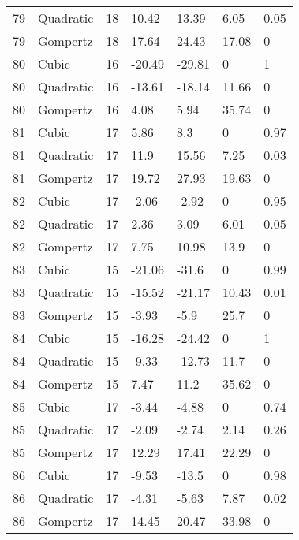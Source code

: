 \documentclass[11pt]{article}
\begin{document}
\begin{center}
\begin{longtable}{lllllll}
    79  & Quadratic & 18              & 10.42   & 13.39   & 6.05    & 0.05 \\
    79  & Gompertz  & 18              & 17.64   & 24.43   & 17.08   & 0    \\
    80  & Cubic     & 16              & -20.49  & -29.81  & 0       & 1    \\
    80  & Quadratic & 16              & -13.61  & -18.14  & 11.66   & 0    \\
    80  & Gompertz  & 16              & 4.08    & 5.94    & 35.74   & 0    \\
    81  & Cubic     & 17              & 5.86    & 8.3     & 0       & 0.97 \\
    81  & Quadratic & 17              & 11.9    & 15.56   & 7.25    & 0.03 \\
    81  & Gompertz  & 17              & 19.72   & 27.93   & 19.63   & 0    \\
    82  & Cubic     & 17              & -2.06   & -2.92   & 0       & 0.95 \\
    82  & Quadratic & 17              & 2.36    & 3.09    & 6.01    & 0.05 \\
    82  & Gompertz  & 17              & 7.75    & 10.98   & 13.9    & 0    \\
    83  & Cubic     & 15              & -21.06  & -31.6   & 0       & 0.99 \\
    83  & Quadratic & 15              & -15.52  & -21.17  & 10.43   & 0.01 \\
    83  & Gompertz  & 15              & -3.93   & -5.9    & 25.7    & 0    \\
    84  & Cubic     & 15              & -16.28  & -24.42  & 0       & 1    \\
    84  & Quadratic & 15              & -9.33   & -12.73  & 11.7    & 0    \\
    84  & Gompertz  & 15              & 7.47    & 11.2    & 35.62   & 0    \\
    85  & Cubic     & 17              & -3.44   & -4.88   & 0       & 0.74 \\
    85  & Quadratic & 17              & -2.09   & -2.74   & 2.14    & 0.26 \\
    85  & Gompertz  & 17              & 12.29   & 17.41   & 22.29   & 0    \\
    86  & Cubic     & 17              & -9.53   & -13.5   & 0       & 0.98 \\
    86  & Quadratic & 17              & -4.31   & -5.63   & 7.87    & 0.02 \\
    86  & Gompertz  & 17              & 14.45   & 20.47   & 33.98   & 0    \\

\end{longtable}
\end{center}
\end{document}
